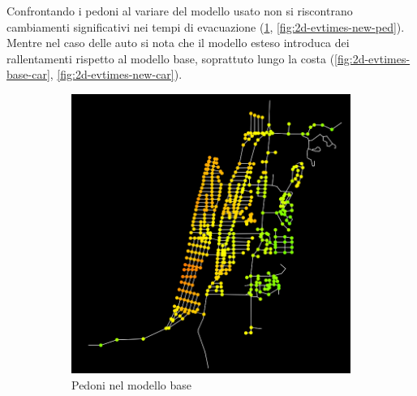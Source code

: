 Confrontando i pedoni al variare del modello usato non si riscontrano cambiamenti significativi nei tempi di evacuazione (\ref{fig:2d-evtimes-base-ped}, \ref{fig:2d-evtimes-new-ped}).
Mentre nel caso delle auto si nota che il modello esteso introduca dei rallentamenti rispetto al modello base, soprattuto lungo la costa (\ref{fig:2d-evtimes-base-car}, \ref{fig:2d-evtimes-new-car}).


\begin{figure}[ht]
    \centering
    \begin{subfigure}{0.475\textwidth}
        \centering
        \includegraphics[width=\textwidth]{images/analisi/comparison-ev-times-map-base-ped.png}
        \caption{Pedoni nel modello base}
        \label{fig:2d-evtimes-base-ped}
    \end{subfigure}
    \hfill
    \begin{subfigure}{0.475\textwidth}
        \centering

\end{subfigure}
\end{figure}
